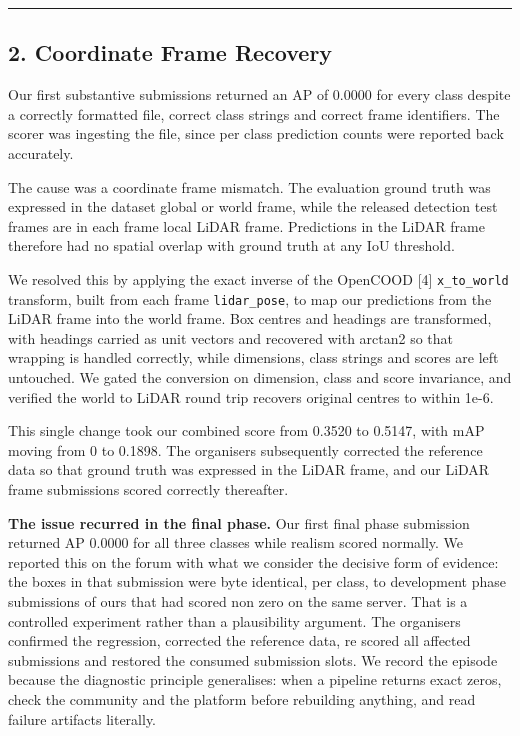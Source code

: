 \documentclass[
  10pt,
]{article}
\begin{document}
\begin{center}\rule{0.5\linewidth}{0.5pt}\end{center}

\subsection{2. Coordinate Frame
Recovery}\label{coordinate-frame-recovery}

Our first substantive submissions returned an AP of 0.0000 for every
class despite a correctly formatted file, correct class strings and
correct frame identifiers. The scorer was ingesting the file, since per
class prediction counts were reported back accurately.

The cause was a coordinate frame mismatch. The evaluation ground truth
was expressed in the dataset global or world frame, while the released
detection test frames are in each frame local LiDAR frame. Predictions
in the LiDAR frame therefore had no spatial overlap with ground truth at
any IoU threshold.

We resolved this by applying the exact inverse of the OpenCOOD {[}4{]}
\texttt{x\_to\_world} transform, built from each frame
\texttt{lidar\_pose}, to map our predictions from the LiDAR frame into
the world frame. Box centres and headings are transformed, with headings
carried as unit vectors and recovered with arctan2 so that wrapping is
handled correctly, while dimensions, class strings and scores are left
untouched. We gated the conversion on dimension, class and score
invariance, and verified the world to LiDAR round trip recovers original
centres to within 1e-6.

This single change took our combined score from 0.3520 to 0.5147, with
mAP moving from 0 to 0.1898. The organisers subsequently corrected the
reference data so that ground truth was expressed in the LiDAR frame,
and our LiDAR frame submissions scored correctly thereafter.

\textbf{The issue recurred in the final phase.} Our first final phase
submission returned AP 0.0000 for all three classes while realism scored
normally. We reported this on the forum with what we consider the
decisive form of evidence: the boxes in that submission were byte
identical, per class, to development phase submissions of ours that had
scored non zero on the same server. That is a controlled experiment
rather than a plausibility argument. The organisers confirmed the
regression, corrected the reference data, re scored all affected
submissions and restored the consumed submission slots. We record the
episode because the diagnostic principle generalises: when a pipeline
returns exact zeros, check the community and the platform before
rebuilding anything, and read failure artifacts literally.
\end{document}
